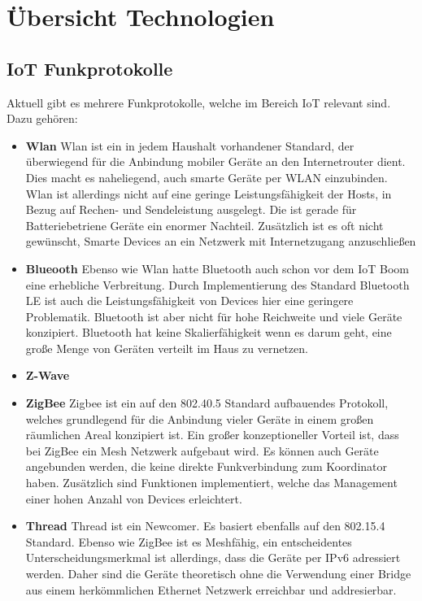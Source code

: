 \chapter{Übersicht Technologien}

\section{IoT Funkprotokolle}
Aktuell gibt es mehrere Funkprotokolle, welche im Bereich IoT relevant sind. Dazu gehören:
\begin{itemize}
    \item \textbf{Wlan}
    Wlan ist ein in jedem Haushalt vorhandener Standard, der überwiegend für die Anbindung mobiler Geräte an den
    Internetrouter dient. Dies macht es naheliegend, auch smarte Geräte per WLAN einzubinden. Wlan ist allerdings 
    nicht auf eine geringe Leistungsfähigkeit der Hosts, in Bezug auf Rechen- und Sendeleistung ausgelegt. Die ist
    gerade für Batteriebetriene Geräte ein enormer Nachteil. Zusätzlich ist es oft nicht gewünscht, Smarte Devices
    an ein Netzwerk mit Internetzugang anzuschließen

    \item \textbf{Blueooth}
    Ebenso wie Wlan hatte Bluetooth auch schon vor dem IoT Boom eine erhebliche Verbreitung. Durch Implementierung 
    des Standard Bluetooth LE ist auch die Leistungsfähigkeit von Devices hier eine geringere Problematik. Bluetooth
    ist aber nicht für hohe Reichweite und viele Geräte konzipiert. Bluetooth hat keine Skalierfähigkeit wenn es darum
    geht, eine große Menge von Geräten verteilt im Haus zu vernetzen.

    \item \textbf{Z-Wave}
    
    \item \textbf{ZigBee}
    Zigbee ist ein auf den 802.40.5 Standard aufbauendes Protokoll, welches grundlegend für die Anbindung vieler
    Geräte in einem großen räumlichen Areal konzipiert ist. Ein großer konzeptioneller Vorteil ist, dass bei 
    ZigBee ein Mesh Netzwerk aufgebaut wird. Es können auch Geräte angebunden werden, die keine direkte Funkverbindung
    zum Koordinator haben. Zusätzlich sind Funktionen implementiert, welche das Management einer hohen Anzahl von Devices
    erleichtert.
    
    \item \textbf{Thread}
    Thread ist ein Newcomer. Es basiert ebenfalls auf den 802.15.4 Standard. Ebenso wie ZigBee ist es Meshfähig, ein
    entscheidentes Unterscheidungsmerkmal ist allerdings, dass die Geräte per IPv6 adressiert werden. Daher sind die Geräte
    theoretisch ohne die Verwendung einer Bridge aus einem herkömmlichen Ethernet Netzwerk erreichbar und addresierbar.
\end{itemize}

